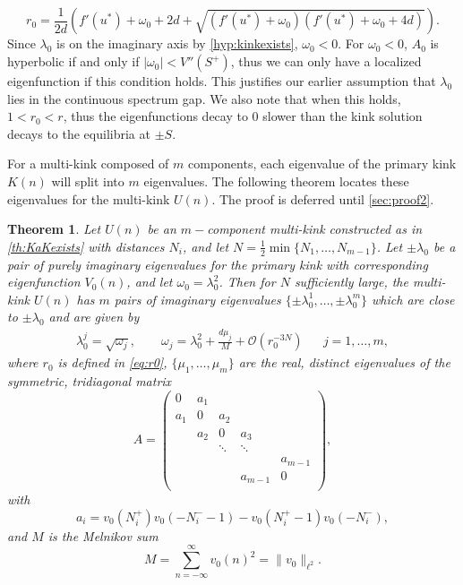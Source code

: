 \documentclass[12pt,reqno]{amsart}
\newtheorem{theorem}{Theorem}
\begin{document}
\begin{equation}\label{eq:r0}
r_0 = \frac{1}{2d}\left( f'(u^*) + \omega_0 + 2d + \sqrt{(f'(u^*)+ \omega_0)(f'(u^*) + \omega_0 + 4d)} \right).
\end{equation}
Since $\lambda_0$ is on the imaginary axis by \cref{hyp:kinkexists}, $\omega_0 < 0$. For $\omega_0 < 0$, $A_0$ is hyperbolic if and only if $|\omega_0| < V''(S^+)$, thus we can only have a localized eigenfunction if this condition holds. This justifies our earlier assumption that $\lambda_0$ lies in the continuous spectrum gap. We also note that when this holds, $1 < r_0 < r$, thus the eigenfunctions decay to 0 slower than the kink solution decays to the equilibria at $\pm S$.

For a multi-kink composed of $m$ components, each eigenvalue of the primary kink $K(n)$ will split into $m$ eigenvalues. The following theorem locates these eigenvalues for the multi-kink $U(n)$. The proof is deferred until \cref{sec:proof2}.

\begin{theorem}\label{th:stability}
Let $U(n)$ be an $m-$component multi-kink constructed as in \cref{th:KaKexists} with distances $N_i$, and let $N = \frac{1}{2} \min\{ N_1, \dots, N_{m-1}\}$. Let $\pm \lambda_0$ be a pair of purely imaginary eigenvalues for the primary kink with corresponding eigenfunction $V_0(n)$, and let $\omega_0 = \lambda_0^2$. Then for $N$ sufficiently large, the multi-kink $U(n)$ has $m$ pairs of imaginary eigenvalues $\{\pm \lambda_0^1, \dots, \pm \lambda_0^m \}$ which are close to $\pm \lambda_0$ and are given by
\begin{align}\label{eq:lambdaj}
	\lambda_0^j = \sqrt{\omega_j}, \qquad
	\omega_j = \lambda_0^2 + \frac{d \mu_j}{M} + \mathcal{O}(r_0^{-3N}) && j = 1, \dots, m,
\end{align}
where $r_0$ is defined in \cref{eq:r0}, $\{ \mu_1, \dots, \mu_m \}$ are the real, distinct eigenvalues of the symmetric, tridiagonal matrix
\begin{equation}\label{eq:matrixA}
	A = \begin{pmatrix}
	0 & a_1 & & & \\
	a_1 & 0 & a_2 \\
	& a_2 & 0 & a_3 \\
	& & \ddots & \ddots & \\
	& & & & a_{m-1}  \\
	& & & a_{m-1} & 0  \\
	\end{pmatrix},
\end{equation}
with 
\begin{equation}\label{eq:ai}
	a_i = v_0(N_i^+)v_0(-N_i^- - 1) - v_0(N_i^+ - 1)v_0(-N_i^-),
\end{equation}
and $M$ is the Melnikov sum
\begin{equation}\label{eq:Minth}
	M = \sum_{n = -\infty}^{\infty} v_0(n)^2 = \| v_0 \|_{\ell^2}.
	\end{equation}
\end{theorem}
\end{document}
